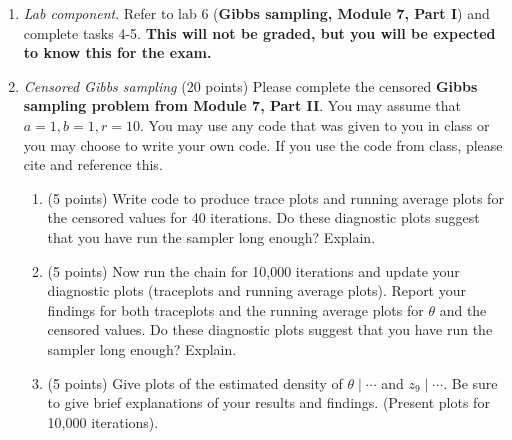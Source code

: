 \documentclass{article}
\begin{document}
\begin{enumerate}
\item \emph{Lab component}. Refer to lab 6 (\textbf{Gibbs sampling, Module 7, Part I}) and complete tasks 4-5. \textbf{This will not be graded, but you will be expected to know this for the exam.}

\item \emph{Censored Gibbs sampling} (20 points) Please complete the censored \textbf{Gibbs sampling problem from Module 7, Part II}. You may assume that $a=1,b=1, r=10.$ You may use any code that was given to you in class or you may choose to write your own code. If you use the code from class, please cite and reference this.

\begin{enumerate}
\item (5 points) Write code to produce trace plots and running average plots for the censored values for 40 iterations. Do these diagnostic plots suggest that you have run the sampler long enough? Explain. 

\item (5 points) Now run the chain for 10,000 iterations  and update your diagnostic plots (traceplots and running average plots). Report your findings for both traceplots and the running average plots for $\theta$ and the censored values. Do these diagnostic plots suggest that you have run the sampler long enough? Explain. 

\item (5 points) Give plots of the estimated density of $\theta \mid \cdots$ and $z_9 \mid \cdots$. Be sure to give brief explanations of your results and findings. (Present plots for 10,000 iterations). 


\end{enumerate}
\end{enumerate}
\end{document}

